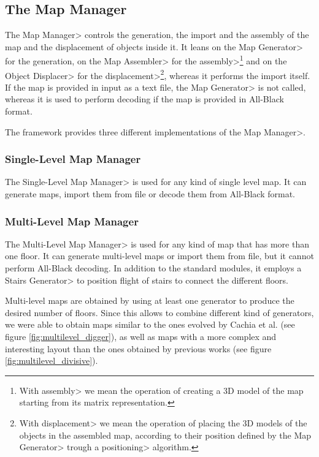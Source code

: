 
\subsection{The Map Manager}

The \<Map Manager> controls the generation, the import and the assembly of the map and the displacement of objects inside it. It leans on the \<Map Generator> for the generation, on the \<Map Assembler> for the \<assembly>\footnote{With \<assembly> we mean the operation of creating a 3D model of the map starting from its matrix representation.} and on the \<Object Displacer> for the \<displacement>\footnote{With \<displacement> we mean the operation of placing the 3D models of the objects in the assembled map, according to their position defined by the \<Map Generator> trough a \<positioning> algorithm.}, whereas it performs the import itself. If the map is provided in input as a text file, the \<Map Generator> is not called, whereas it is used to perform decoding if the map is provided in All-Black format.

\par

The framework provides three different implementations of the \<Map Manager>.

\subsubsection{Single-Level Map Manager}

The \<Single-Level Map Manager> is used for any kind of single level map. It can generate maps, import them from file or decode them from All-Black format.

\subsubsection{Multi-Level Map Manager}

The \<Multi-Level Map Manager> is used for any kind of map that has more than one floor. It can generate multi-level maps or import them from file, but it cannot perform All-Black decoding. In addition to the standard modules, it employs a \<Stairs Generator> to position flight of stairs to connect the different floors. 

\par

Multi-level maps are obtained by using at least one generator to produce the desired number of floors. Since this allows to combine different kind of generators, we were able to obtain maps similar to the ones evolved by Cachia et al.\cite{MultiLevelEvolution} (see figure \ref{fig:multilevel_digger}), as well as maps with a more complex and interesting layout than the ones obtained by previous works (see figure \ref{fig:multilevel_divisive}).

